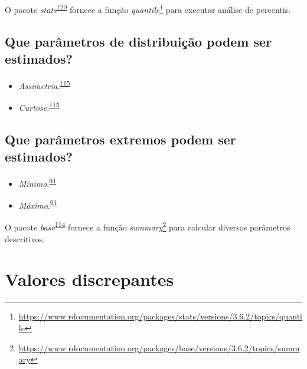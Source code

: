 \documentclass[
  a4paper,
]{book}
\renewcommand{\href}[2]{#2\footnote{\url{#1}}}
\newenvironment{infobox}[1]
  {
  \begin{itemize}
  \renewcommand{\labelitemi}{
    \raisebox{-.7\height}[0pt][0pt]{
      {\setkeys{Gin}{width=3em,keepaspectratio}
        \texttt{[image: \#1]}}
    }
  }
  \setlength{\fboxsep}{1em}
  \begin{blackbox}
  \item
  }
  {
  \end{blackbox}
  \end{itemize}
  }
\begin{document}
\begin{infobox}{images/Rlogo}
O pacote \emph{stats}\textsuperscript{\protect\hyperlink{ref-base}{120}} fornece a função \href{https://www.rdocumentation.org/packages/stats/versions/3.6.2/topics/quantile}{\emph{quantile}} para executar análise de percentis.

\end{infobox}

\hypertarget{que-paruxe2metros-de-distribuiuxe7uxe3o-podem-ser-estimados}{%
\subsection{Que parâmetros de distribuição podem ser estimados?}\label{que-paruxe2metros-de-distribuiuxe7uxe3o-podem-ser-estimados}}

\begin{itemize}
\item
  \emph{Assimetria}.\textsuperscript{\protect\hyperlink{ref-kanji2006}{115}}
\item
  \emph{Curtose}.\textsuperscript{\protect\hyperlink{ref-kanji2006}{115}}
\end{itemize}

\hypertarget{que-paruxe2metros-extremos-podem-ser-estimados}{%
\subsection{Que parâmetros extremos podem ser estimados?}\label{que-paruxe2metros-extremos-podem-ser-estimados}}

\begin{itemize}
\item
  \emph{Mínimo}.\textsuperscript{\protect\hyperlink{ref-Ali2016}{91}}
\item
  \emph{Máximo}.\textsuperscript{\protect\hyperlink{ref-Ali2016}{91}}
\end{itemize}

\begin{infobox}{images/Rlogo}
O pacote \emph{base}\textsuperscript{\protect\hyperlink{ref-base-6}{114}} fornece a função \href{https://www.rdocumentation.org/packages/base/versions/3.6.2/topics/summary}{\emph{summary}} para calcular diversos parâmetros descritivos.

\end{infobox}

\hypertarget{outliers}{%
\section{Valores discrepantes}\label{outliers}}
\end{document}
